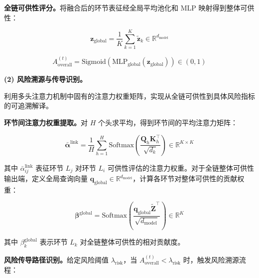 \textbf{全链可供性评分。}将融合后的环节表征经全局平均池化和 MLP 映射得到整体可供性：

\begin{equation}
\mathbf{z}_{\text{global}} = \frac{1}{K} \sum_{k=1}^{K} \tilde{\mathbf{z}}_k \in \mathbb{R}^{d_{\text{model}}}
\end{equation}

\begin{equation}
A_{\text{overall}}^{(t)} = \text{Sigmoid}\left(\text{MLP}_{\text{global}}\left(\mathbf{z}_{\text{global}}\right)\right) \in (0,1)
\end{equation}

\textbf{(2) 风险溯源与传导识别。}

利用多头注意力机制中固有的注意力权重矩阵，实现从全链可供性到具体风险指标的可追溯解译。

\textbf{环节间注意力权重提取。}对 $H$ 个头求平均，得到环节间的平均注意力矩阵：

\begin{equation}
\bar{\boldsymbol{\alpha}}^{\text{link}} = \frac{1}{H} \sum_{h=1}^{H} \text{Softmax}\left(\frac{\mathbf{Q}_h\mathbf{K}_h^{\top}}{\sqrt{d_k}}\right) \in \mathbb{R}^{K\times K}
\end{equation}

其中 $\bar{\alpha}_{ij}^{\text{link}}$ 表征环节 $L_j$ 对环节 $L_i$ 可供性评估的注意力权重。对于全链整体可供性输出端，定义全局查询向量 $\mathbf{q}_{\text{global}}\in\mathbb{R}^{d_{\text{model}}}$，计算各环节对整体可供性的贡献权重：

\begin{equation}
\boldsymbol{\beta}^{\text{global}} = \text{Softmax}\left(\frac{\mathbf{q}_{\text{global}}\tilde{\mathbf{Z}}^{\top}}{\sqrt{d_{\text{model}}}}\right) \in \mathbb{R}^{K}
\end{equation}

其中 $\beta_k^{\text{global}}$ 表示环节 $L_k$ 对全链整体可供性的相对贡献度。

\textbf{风险传导路径识别。}给定风险阈值 $\lambda_{\text{risk}}$，当 $A_{\text{overall}}^{(t)} < \lambda_{\text{risk}}$ 时，触发风险溯源流程：

